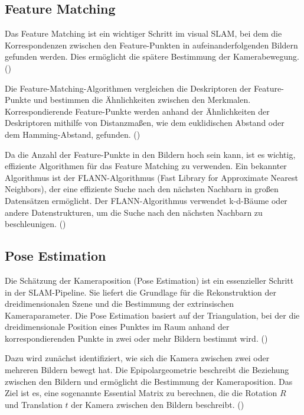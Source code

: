 \subsection{Feature Matching}

Das Feature Matching ist ein wichtiger Schritt im visual SLAM, bei dem die Korrespondenzen zwischen den Feature-Punkten in aufeinanderfolgenden Bildern gefunden werden. Dies ermöglicht die spätere Bestimmung der Kamerabewegung. (\cite{gao2021vSLAM, szeliski2022computerVision})

Die Feature-Matching-Algorithmen vergleichen die Deskriptoren der Feature-Punkte und bestimmen die Ähnlichkeiten zwischen den Merkmalen. Korrespondierende Feature-Punkte werden anhand der Ähnlichkeiten der Deskriptoren mithilfe von Distanzmaßen, wie dem euklidischen Abstand oder dem Hamming-Abstand, gefunden. (\cite{gao2021vSLAM, szeliski2022computerVision})

Da die Anzahl der Feature-Punkte in den Bildern hoch sein kann, ist es wichtig, effiziente Algorithmen für das Feature Matching zu verwenden. Ein bekannter Algorithmus ist der FLANN-Algorithmus (Fast Library for Approximate Nearest Neighbors), der eine effiziente Suche nach den nächsten Nachbarn in großen Datensätzen ermöglicht. Der FLANN-Algorithmus verwendet k-d-Bäume oder andere Datenstrukturen, um die Suche nach den nächsten Nachbarn zu beschleunigen. (\cite{gao2021vSLAM, szeliski2022computerVision})

\subsection{Pose Estimation}

Die Schätzung der Kameraposition (Pose Estimation) ist ein essenzieller Schritt in der SLAM-Pipeline. Sie liefert die Grundlage für die Rekonstruktion der dreidimensionalen Szene und die Bestimmung der extrinsischen Kameraparameter. Die Pose Estimation basiert auf der Triangulation, bei der die dreidimensionale Position eines Punktes im Raum anhand der korrespondierenden Punkte in zwei oder mehr Bildern bestimmt wird. (\cite{gao2021vSLAM})

Dazu wird zunächst identifiziert, wie sich die Kamera zwischen zwei oder mehreren Bildern bewegt hat. Die Epipolargeometrie beschreibt die Beziehung zwischen den Bildern und ermöglicht die Bestimmung der Kameraposition.  Das Ziel ist es, eine sogenannte Essential Matrix zu berechnen, die die Rotation \( R \) und Translation \( t \) der Kamera zwischen den Bildern beschreibt. (\cite{gao2021vSLAM})

